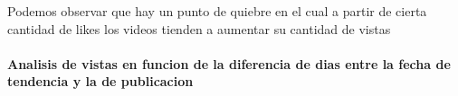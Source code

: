             \begin{figure}[ht]
            \end{figure}
        \FloatBarrier
        Podemos observar que hay un punto de quiebre en el cual a partir de
        cierta cantidad de likes los videos tienden a aumentar su cantidad
        de vistas

        \newpage
        \paragraph{Analisis de vistas en funcion de la diferencia de dias entre la fecha de tendencia y la de publicacion}


